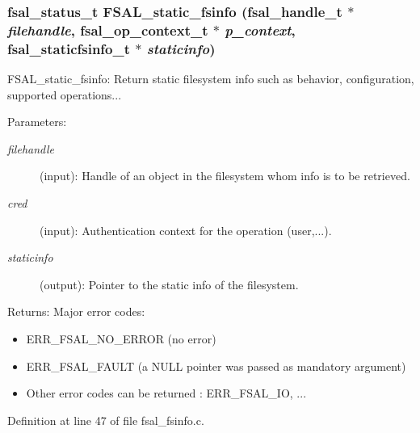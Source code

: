 \subsubsection[{FSAL\_\-static\_\-fsinfo}]{\setlength{\rightskip}{0pt plus 5cm}fsal\_\-status\_\-t FSAL\_\-static\_\-fsinfo (fsal\_\-handle\_\-t $\ast$ {\em filehandle}, \/  fsal\_\-op\_\-context\_\-t $\ast$ {\em p\_\-context}, \/  fsal\_\-staticfsinfo\_\-t $\ast$ {\em staticinfo})}\label{fsal__fsinfo_8c_3fab4c682d6434eaafbdb04fb3ba000c}


FSAL\_\-static\_\-fsinfo: Return static filesystem info such as behavior, configuration, supported operations...

\begin{Desc}
\item[Parameters:]
\begin{description}
\item[{\em filehandle}](input): Handle of an object in the filesystem whom info is to be retrieved. \item[{\em cred}](input): Authentication context for the operation (user,...). \item[{\em staticinfo}](output): Pointer to the static info of the filesystem.\end{description}
\end{Desc}
\begin{Desc}
\item[Returns:]Major error codes:\begin{itemize}
\item ERR\_\-FSAL\_\-NO\_\-ERROR (no error)\item ERR\_\-FSAL\_\-FAULT (a NULL pointer was passed as mandatory argument)\item Other error codes can be returned : ERR\_\-FSAL\_\-IO, ... \end{itemize}
\end{Desc}


Definition at line 47 of file fsal\_\-fsinfo.c.